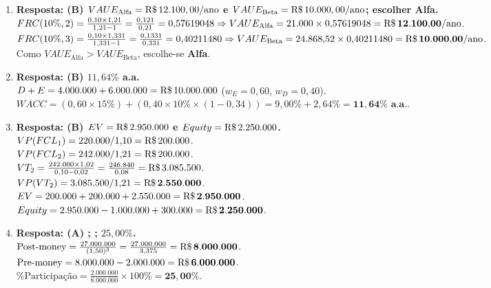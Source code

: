 \begin{boxGabarito}
\begin{enumerate}[leftmargin=1.5em, itemsep=5pt]
  \item \textbf{Resposta: (B) $VAUE_{\text{Alfa}} = \text{R\$\,}{12.100,00/\text{ano}}$ e $VAUE_{\text{Beta}} = \text{R\$\,}{10.000,00/\text{ano}}$; escolher Alfa.} \\
  $FRC(10\%, 2) = \frac{0{,}10 \times 1{,}21}{1{,}21 - 1} = \frac{0{,}121}{0{,}21} = 0{,}57619048 \Rightarrow VAUE_{\text{Alfa}} = 21.000 \times 0{,}57619048 = \mathbf{\text{R\$\,}{12.100{,}00/\text{ano}}}$. \\
  $FRC(10\%, 3) = \frac{0{,}10 \times 1{,}331}{1{,}331 - 1} = \frac{0{,}1331}{0{,}331} = 0{,}40211480 \Rightarrow VAUE_{\text{Beta}} = 24.868{,}52 \times 0{,}40211480 = \mathbf{\text{R\$\,}{10.000{,}00/\text{ano}}}$. \\
  Como $VAUE_{\text{Alfa}} > VAUE_{\text{Beta}}$, escolhe-se \textbf{Alfa}.

  \item \textbf{Resposta: (B) $11{,}64\%$ a.a.} \\
  $D + E = 4.000.000 + 6.000.000 = \text{R\$\,}{10.000.000}$ ($w_E = 0{,}60$, $w_D = 0{,}40$). \\
  $WACC = (0{,}60 \times 15\%) + (0{,}40 \times 10\% \times (1 - 0{,}34)) = 9{,}00\% + 2{,}64\% = \mathbf{11{,}64\%\text{ a.a.}}$.

  \item \textbf{Resposta: (B) $EV = \text{R\$\,}{2.950.000}$ e $Equity = \text{R\$\,}{2.250.000}$.} \\
  $VP(FCL_1) = 220.000 / 1{,}10 = \text{R\$\,}{200.000}$. \\
  $VP(FCL_2) = 242.000 / 1{,}21 = \text{R\$\,}{200.000}$. \\
  $VT_2 = \frac{242.000 \times 1{,}02}{0{,}10 - 0{,}02} = \frac{246.840}{0{,}08} = \text{R\$\,}{3.085.500}$. \\
  $VP(VT_2) = 3.085.500 / 1{,}21 = \mathbf{\text{R\$\,}{2.550.000}}$. \\
  $EV = 200.000 + 200.000 + 2.550.000 = \mathbf{\text{R\$\,}{2.950.000}}$. \\
  $Equity = 2.950.000 - 1.000.000 + 300.000 = \mathbf{\text{R\$\,}{2.250.000}}$.

  \item \textbf{Resposta: (A) ; ; $25{,}00\%$.} \\
  $\text{Post-money} = \frac{27.000.000}{(1{,}50)^3} = \frac{27.000.000}{3{,}375} = \mathbf{\text{R\$\,}{8.000.000}}$. \\
  $\text{Pre-money} = 8.000.000 - 2.000.000 = \mathbf{\text{R\$\,}{6.000.000}}$. \\
  $\%\text{Participação} = \frac{2.000.000}{8.000.000} \times 100\% = \mathbf{25{,}00\%}$.
\end{enumerate}
\end{boxGabarito}


